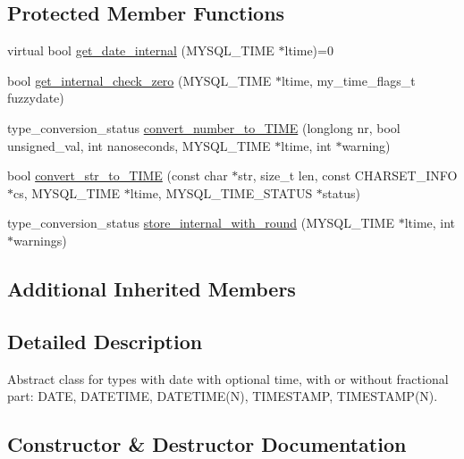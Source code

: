 \subsection*{Protected Member Functions}
\begin{DoxyCompactItemize}
\item 
virtual bool \mbox{\hyperlink{classField__temporal__with__date_aef905f77b5430dd2b3ef461ce916b4ef}{get\+\_\+date\+\_\+internal}} (M\+Y\+S\+Q\+L\+\_\+\+T\+I\+ME $\ast$ltime)=0
\item 
bool \mbox{\hyperlink{classField__temporal__with__date_a771e7058c51d29caf989396ecbe8bbb3}{get\+\_\+internal\+\_\+check\+\_\+zero}} (M\+Y\+S\+Q\+L\+\_\+\+T\+I\+ME $\ast$ltime, my\+\_\+time\+\_\+flags\+\_\+t fuzzydate)
\item 
type\+\_\+conversion\+\_\+status \mbox{\hyperlink{classField__temporal__with__date_a161cad8d28fa79b793aca5a59b5c9044}{convert\+\_\+number\+\_\+to\+\_\+\+T\+I\+ME}} (longlong nr, bool unsigned\+\_\+val, int nanoseconds, M\+Y\+S\+Q\+L\+\_\+\+T\+I\+ME $\ast$ltime, int $\ast$warning)
\item 
bool \mbox{\hyperlink{classField__temporal__with__date_ae39fe9b7b0dbb013f52ce93551420886}{convert\+\_\+str\+\_\+to\+\_\+\+T\+I\+ME}} (const char $\ast$str, size\+\_\+t len, const C\+H\+A\+R\+S\+E\+T\+\_\+\+I\+N\+FO $\ast$cs, M\+Y\+S\+Q\+L\+\_\+\+T\+I\+ME $\ast$ltime, M\+Y\+S\+Q\+L\+\_\+\+T\+I\+M\+E\+\_\+\+S\+T\+A\+T\+US $\ast$status)
\item 
type\+\_\+conversion\+\_\+status \mbox{\hyperlink{classField__temporal__with__date_a737fca0e5e576c4ae32386f6dc306a3c}{store\+\_\+internal\+\_\+with\+\_\+round}} (M\+Y\+S\+Q\+L\+\_\+\+T\+I\+ME $\ast$ltime, int $\ast$warnings)
\end{DoxyCompactItemize}
\subsection*{Additional Inherited Members}


\subsection{Detailed Description}
Abstract class for types with date with optional time, with or without fractional part\+: D\+A\+TE, D\+A\+T\+E\+T\+I\+ME, D\+A\+T\+E\+T\+I\+M\+E(\+N), T\+I\+M\+E\+S\+T\+A\+MP, T\+I\+M\+E\+S\+T\+A\+M\+P(\+N). 

\subsection{Constructor \& Destructor Documentation}
\mbox{\label{classField__temporal__with__date_add449ec4ea8b3be7ee002d3def0a9c02}} 
